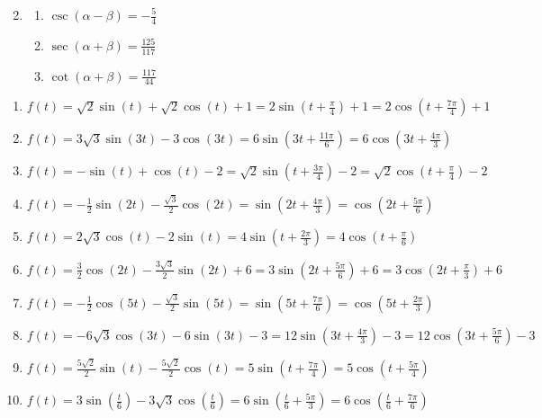 \documentclass{ximera}
\begin{document}
\begin{enumerate}
\begin{multicols}{3}
\begin{enumerate}
\end{enumerate}

\end{multicols}

 

\item \begin{multicols}{3}

\begin{enumerate}

\item $\csc(\alpha - \beta) = -\frac{5}{4}$
\item $\sec(\alpha + \beta) = \frac{125}{117}$
\item $\cot(\alpha + \beta) = \frac{117}{44}$

\end{enumerate}

\end{multicols}

\setcounter{HW}{\value{enumi}}

\end{enumerate}

\begin{enumerate}
\setcounter{enumi}{\value{HW}}
\item $f(t) = \sqrt{2}\sin(t) + \sqrt{2}\cos(t) + 1 = 2\sin\left(t + \frac{\pi}{4}\right) + 1 = 2\cos\left(t + \frac{7\pi}{4}\right) + 1$ 
\item $f(t) = 3\sqrt{3}\sin(3t) - 3\cos(3t) = 6\sin\left(3t + \frac{11\pi}{6}\right) = 6\cos\left(3t + \frac{4\pi}{3}\right)$
\item $f(t) = -\sin(t) + \cos(t) - 2 = \sqrt{2}\sin\left(t + \frac{3\pi}{4}\right) - 2 = \sqrt{2}\cos\left(t + \frac{\pi}{4}\right) - 2$
\item $f(t) = -\frac{1}{2}\sin(2t) - \frac{\sqrt{3}}{2}\cos(2t) = \sin\left(2t + \frac{4\pi}{3}\right) = \cos\left(2t + \frac{5\pi}{6}\right)$
\item $f(t) = 2\sqrt{3} \cos(t) - 2\sin(t) = 4\sin\left(t+\frac{2\pi}{3}  \right)  = 4\cos\left(t + \frac{\pi}{6}\right)$
\item  $f(t) = \frac{3}{2} \cos(2t) - \frac{3\sqrt{3}}{2} \sin(2t) + 6 =3\sin\left(2t + \frac{5\pi}{6}\right) + 6   = 3\cos\left(2t + \frac{\pi}{3}\right) + 6$
\item  $f(t) = -\frac{1}{2} \cos(5t) -\frac{\sqrt{3}}{2} \sin(5t) =  \sin\left(5t + \frac{7\pi}{6}\right) = \cos\left(5t + \frac{2\pi}{3}\right)$
\item  $f(t) = -6\sqrt{3} \cos(3t) - 6\sin(3t) - 3 = 12\sin\left(3t + \frac{4\pi}{3}\right) - 3 = 12\cos\left(3t + \frac{5\pi}{6}\right) - 3$
\item  $f(t) =  \frac{5\sqrt{2}}{2} \sin(t)  -\frac{5\sqrt{2}}{2} \cos(t) = 5\sin\left(t + \frac{7\pi}{4}\right)= 5\cos\left(t + \frac{5\pi}{4}\right)$
\item  $f(t) =3\sin\left(\frac{t}{6}\right) -3\sqrt{3} \cos\left(\frac{t}{6}\right) = 6\sin\left( \frac{t}{6}+\frac{5\pi}{3}\right)= 6\cos\left( \frac{t}{6}+\frac{7\pi}{6}\right) $

\setcounter{HW}{\value{enumi}}
\end{enumerate}
\end{document}
